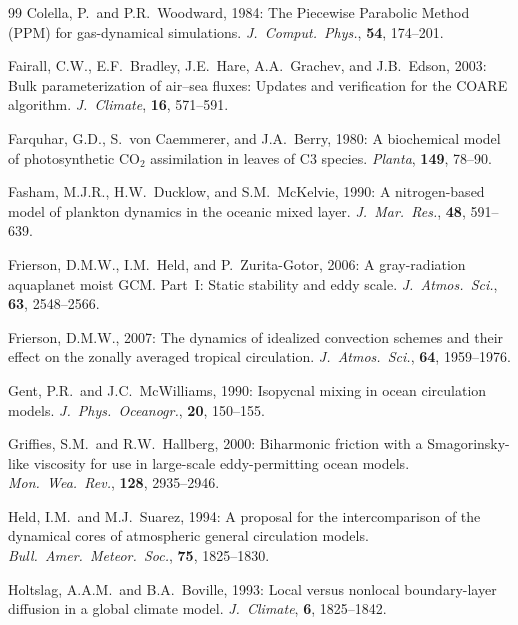 \documentclass[11pt,twoside]{report}
\begin{document}
\begin{thebibliography}{99}
Colella, P.\ and P.R.~Woodward, 1984:
The Piecewise Parabolic Method (PPM) for gas-dynamical simulations.
\textit{J.\ Comput.\ Phys.}, \textbf{54}, 174--201.

Fairall, C.W., E.F.~Bradley, J.E.~Hare, A.A.~Grachev, and J.B.~Edson, 2003:
Bulk parameterization of air--sea fluxes: Updates and verification for the
COARE algorithm.
\textit{J.\ Climate}, \textbf{16}, 571--591.

Farquhar, G.D., S.~von Caemmerer, and J.A.~Berry, 1980:
A biochemical model of photosynthetic CO$_2$ assimilation in leaves of
C3 species.
\textit{Planta}, \textbf{149}, 78--90.

Fasham, M.J.R., H.W.~Ducklow, and S.M.~McKelvie, 1990:
A nitrogen-based model of plankton dynamics in the oceanic mixed layer.
\textit{J.\ Mar.\ Res.}, \textbf{48}, 591--639.

Frierson, D.M.W., I.M.~Held, and P.~Zurita-Gotor, 2006:
A gray-radiation aquaplanet moist GCM. Part~I: Static stability and
eddy scale.
\textit{J.\ Atmos.\ Sci.}, \textbf{63}, 2548--2566.

Frierson, D.M.W., 2007:
The dynamics of idealized convection schemes and their effect on the
zonally averaged tropical circulation.
\textit{J.\ Atmos.\ Sci.}, \textbf{64}, 1959--1976.

Gent, P.R.\ and J.C.~McWilliams, 1990:
Isopycnal mixing in ocean circulation models.
\textit{J.\ Phys.\ Oceanogr.}, \textbf{20}, 150--155.

Griffies, S.M.\ and R.W.~Hallberg, 2000:
Biharmonic friction with a Smagorinsky-like viscosity for use in
large-scale eddy-permitting ocean models.
\textit{Mon.\ Wea.\ Rev.}, \textbf{128}, 2935--2946.

Held, I.M.\ and M.J.~Suarez, 1994:
A proposal for the intercomparison of the dynamical cores of atmospheric
general circulation models.
\textit{Bull.\ Amer.\ Meteor.\ Soc.}, \textbf{75}, 1825--1830.

Holtslag, A.A.M.\ and B.A.~Boville, 1993:
Local versus nonlocal boundary-layer diffusion in a global climate model.
\textit{J.\ Climate}, \textbf{6}, 1825--1842.


\end{thebibliography}
\end{document}
